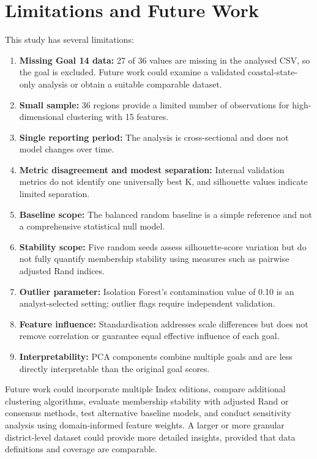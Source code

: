\documentclass[11pt,a4paper]{article}
\begin{document}
\section{Limitations and Future Work}
This study has several limitations:
\begin{enumerate}[leftmargin=1.5em]
  \item \textbf{Missing Goal 14 data:} 27 of 36 values are missing in the analysed CSV, so the goal is excluded. Future work could examine a validated coastal-state-only analysis or obtain a suitable comparable dataset.
  \item \textbf{Small sample:} 36 regions provide a limited number of observations for high-dimensional clustering with 15 features.
  \item \textbf{Single reporting period:} The analysis is cross-sectional and does not model changes over time.
  \item \textbf{Metric disagreement and modest separation:} Internal validation metrics do not identify one universally best K, and silhouette values indicate limited separation.
  \item \textbf{Baseline scope:} The balanced random baseline is a simple reference and not a comprehensive statistical null model.
  \item \textbf{Stability scope:} Five random seeds assess silhouette-score variation but do not fully quantify membership stability using measures such as pairwise adjusted Rand indices.
  \item \textbf{Outlier parameter:} Isolation Forest's contamination value of 0.10 is an analyst-selected setting; outlier flags require independent validation.
  \item \textbf{Feature influence:} Standardisation addresses scale differences but does not remove correlation or guarantee equal effective influence of each goal.
  \item \textbf{Interpretability:} PCA components combine multiple goals and are less directly interpretable than the original goal scores.
\end{enumerate}

Future work could incorporate multiple Index editions, compare additional clustering algorithms, evaluate membership stability with adjusted Rand or consensus methods, test alternative baseline models, and conduct sensitivity analysis using domain-informed feature weights. A larger or more granular district-level dataset could provide more detailed insights, provided that data definitions and coverage are comparable.
\end{document}
